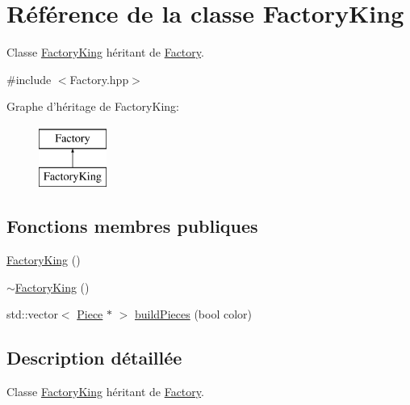 \hypertarget{class_factory_king}{\section{Référence de la classe Factory\-King}
\label{class_factory_king}
}


Classe \hyperlink{class_factory_king}{Factory\-King} héritant de \hyperlink{class_factory}{Factory}.  




{\ttfamily \#include $<$Factory.\-hpp$>$}

Graphe d'héritage de Factory\-King\-:\begin{figure}[H]
\begin{center}
\leavevmode
\includegraphics[height=2.000000cm]{class_factory_king}
\end{center}
\end{figure}
\subsection*{Fonctions membres publiques}
\begin{DoxyCompactItemize}
\item 
\hyperlink{class_factory_king_ad6762ceddcc10d41b5652e17455d3503}{Factory\-King} ()
\item 
\hyperlink{class_factory_king_adbf2005c439f045fb97bdb86147181a7}{$\sim$\-Factory\-King} ()
\item 
std\-::vector$<$ \hyperlink{class_piece}{Piece} $\ast$ $>$ \hyperlink{class_factory_king_a0d5fd0a7340ab7bb50fe63e119c3a3ef}{build\-Pieces} (bool color)
\end{DoxyCompactItemize}


\subsection{Description détaillée}
Classe \hyperlink{class_factory_king}{Factory\-King} héritant de \hyperlink{class_factory}{Factory}. 

